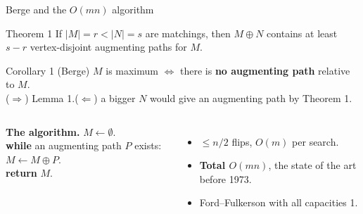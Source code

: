 \documentclass[aspectratio=169,11pt]{beamer}
\begin{document}
\begin{frame}[t]{Berge and the $O(mn)$ algorithm}
\small\vspace{-3mm}
\begin{block}{Theorem 1}
If $|M|=r<|N|=s$ are matchings, then $M\oplus N$ contains at least $s-r$ vertex-disjoint augmenting paths for $M$.
\end{block}
\begin{block}{Corollary 1 (Berge)}
$M$ is maximum $\iff$ there is \textbf{no augmenting path} relative to $M$.\\
{\small($\Rightarrow$) Lemma 1.\quad($\Leftarrow$) a bigger $N$ would give an augmenting path by Theorem 1.}
\end{block}
\begin{columns}[c]
\textbf{The algorithm.} $M\gets\emptyset$.\\
\textbf{while} an augmenting path $P$ exists: $M\gets M\oplus P$.\\
\textbf{return} $M$.
\begin{itemize}\setlength\itemsep{2pt}
  \item $\le n/2$ flips, $O(m)$ per search.
  \item \textcolor{hkred}{\textbf{Total $O(mn)$}, the state of the art before 1973.}
  \item {\footnotesize\textcolor{hkgrey}{Ford--Fulkerson with all capacities 1.}}
\end{itemize}
\end{columns}
\end{frame}
\end{document}
